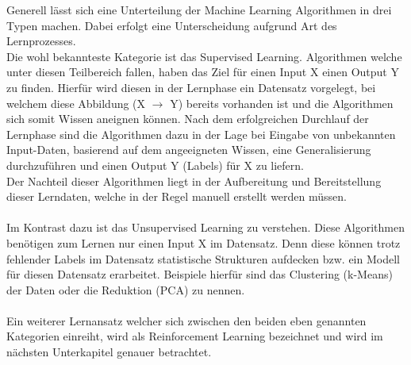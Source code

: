 Generell lässt sich eine Unterteilung der Machine Learning Algorithmen in drei Typen machen. Dabei erfolgt eine Unterscheidung aufgrund Art des Lernprozesses. \\
Die wohl bekannteste Kategorie ist das Supervised Learning. Algorithmen welche unter diesen Teilbereich fallen, haben das Ziel für einen Input X einen Output Y zu finden. Hierfür wird diesen in der Lernphase ein Datensatz vorgelegt, bei welchem diese Abbildung (X $\rightarrow$ Y) bereits vorhanden ist und die Algorithmen sich somit Wissen aneignen können. Nach dem erfolgreichen Durchlauf der Lernphase sind die Algorithmen dazu in der Lage bei Eingabe von unbekannten Input-Daten, basierend auf dem angeeigneten Wissen, eine Generalisierung durchzuführen und einen Output Y (Labels) für X zu liefern. \\
Der Nachteil dieser Algorithmen liegt in der Aufbereitung und Bereitstellung dieser Lerndaten, welche in der Regel manuell erstellt werden müssen. \cite{Engemann}\\\\
Im Kontrast dazu ist das Unsupervised Learning zu verstehen. Diese Algorithmen benötigen zum Lernen nur einen Input X im Datensatz. Denn diese können trotz fehlender Labels im Datensatz statistische Strukturen aufdecken bzw. ein Modell für diesen Datensatz erarbeitet. Beispiele hierfür sind das Clustering (k-Means) der Daten oder die Reduktion (PCA) zu nennen. \cite{Engemann,mlmitchel, Sutton}\\\\
Ein weiterer Lernansatz welcher sich zwischen den beiden eben genannten Kategorien einreiht, wird als Reinforcement Learning bezeichnet und wird im nächsten Unterkapitel genauer betrachtet.

